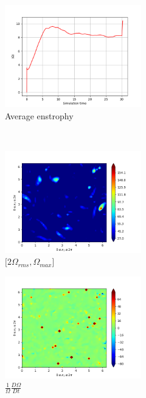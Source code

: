 \begin{figure}[H]
    \begin{subfigure}[H]{0.45\textwidth}
        \includegraphics[height=1.75in]{media/run-cds-65/enst-average1360.png}
        \caption{Average enstrophy}
    \end{subfigure}
    ~
    \begin{subfigure}[H]{0.45\textwidth}
        \includegraphics[height=1.75in]{media/run-cds-65/enst-2-1360.png}
        \caption{$[2\Omega_{rms}, \Omega_{max} $] }
    \end{subfigure}
    \newline
    \begin{subfigure}[H]{0.45\textwidth}
        \includegraphics[height=1.75in]{media/run-cds-65/enst-1360.png}
        \caption{$\frac{1}{\Omega} \frac{D \Omega}{Dt}$}
    \end{subfigure}
    ~
    \begin{subfigure}{0.45\textwidth}

\end{subfigure}
\end{figure}
